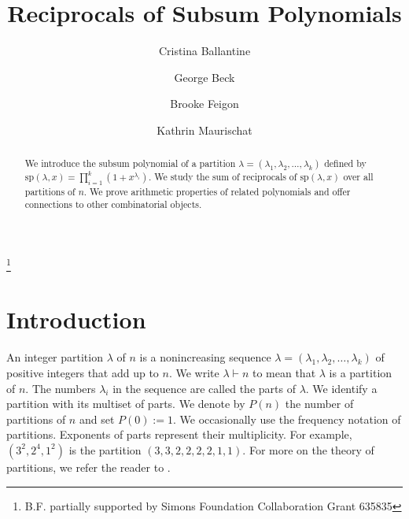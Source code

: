 \documentclass[reqno]{amsart}
\def\sp{\mathrm{sp}}
\theoremstyle{definition}
\begin{document}
\allowdisplaybreaks

\title{Reciprocals of Subsum Polynomials}
\author[C. Ballantine]{Cristina Ballantine}\address{Department of Mathematics and Computer Science\\ College of the Holy Cross \\ Worcester, MA 01610, USA \\} 
 \author[G. Beck]{George Beck} \address{Department of Mathematics and Statistics\\ Dalhousie University\\ Halifax, NS, B3H 4R2, Canada \\}  
\author[B. Feigon]{Brooke Feigon}\thanks{B.F. partially supported by Simons Foundation Collaboration Grant 635835}\address{Department of Mathematics\\
The City College of New York,
CUNY\\
New York, NY 10031, USA \\}
\author[K. Maurischat]{Kathrin Maurischat}\address{Fachgruppe Mathematik\\ RWTH Aachen University\\ Pontdriesch 12-16, 52056 Aachen, Germany\\} 
\begin{abstract} We introduce the subsum polynomial of a partition $\lambda=(\lambda_1, \lambda_2, \ldots, \lambda_k)$  defined by $\sp(\lambda, x)=\prod_{i=1}^k(1+x^{\lambda_i})$. We study the sum of reciprocals of $\sp(\lambda, x)$ over all partitions of $n$. We prove  arithmetic properties of related polynomials and offer connections to other combinatorial objects. 
\end{abstract}
\maketitle
\section{Introduction}

An integer partition $\lambda$ of $n$ is a nonincreasing sequence $\lambda=(\lambda_1, \lambda_2, \ldots, \lambda_k)$ of positive integers that add up to $n$. We write $\lambda\vdash n$ to mean that $\lambda$ is a partition of $n$. The numbers $\lambda_i$ in the sequence are called the parts of $\lambda$. We identify a partition with its multiset of parts. We denote by $P(n)$  the number of partitions of $n$ and set $P(0):=1$.  We occasionally  use the frequency notation of partitions. Exponents of parts represent their multiplicity. For example, $(3^2, 2^4, 1^2)$ is the partition $(3,3,2,2,2,2,1,1)$. For more on the theory of partitions, we refer the reader to \cite{A98}. 
\end{document}

